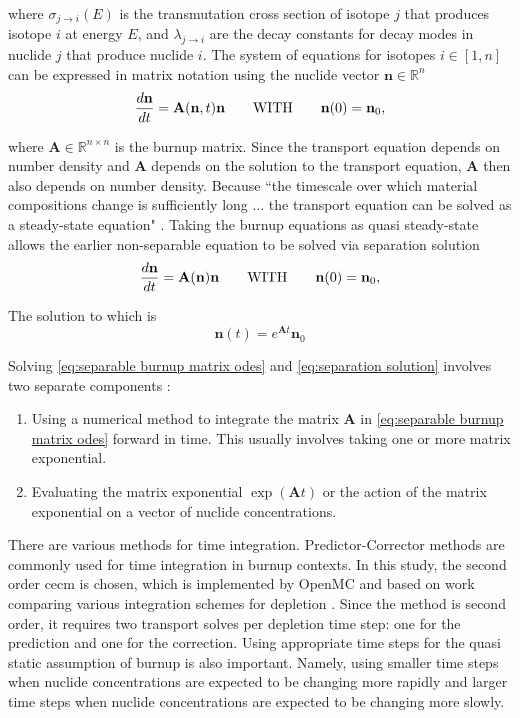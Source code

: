 \documentclass[letterpaper]{physor2024}
\begin{document}
\noindent where $\sigma_{j\rightarrow{i}}(E)$ is the transmutation cross section of isotope $j$ that produces isotope $i$ at energy $E$, and $\lambda_{j\rightarrow{i}}$ are the decay constants for decay modes in nuclide $j$ that produce nuclide $i$. The system of equations for isotopes $i\in[1,n]$ can be expressed in matrix notation using the nuclide vector $\mathbf{n}\in\mathbb{R}^{n}$
\begin{equation} \label{eq:burnup matrix odes}
    \frac{d\textbf{n}}{dt} =
    \textbf{A}(\textbf{n},t) \textbf{n}
    \qquad \text{WITH} \qquad
    \textbf{n}(0) = \textbf{n}_{0},
\end{equation}

\noindent where $\textbf{A}\in\mathbb{R}^{n\times n}$ is the burnup matrix. Since the transport equation depends on number density and $\textbf{A}$ depends on the solution to the transport equation, $\textbf{A}$ then also depends on number density. Because ``the timescale over which material compositions change is sufficiently long ... the transport equation can be solved as a steady-state equation" \cite{romano-depletion-2021}. Taking the burnup equations as quasi steady-state allows the earlier non-separable equation to be solved via separation solution
\begin{equation} \label{eq:separable burnup matrix odes}
    \frac{d\textbf{n}}{dt} =
    \textbf{A}(\textbf{n}) \textbf{n}
    \qquad \text{WITH} \qquad
    \textbf{n}(0) = \textbf{n}_{0},
\end{equation}

\noindent The solution to which is
\begin{equation} \label{eq:separation solution}
     \textbf{n}(t) = e^{\textbf{A}t} \textbf{n}_{0}
\end{equation}

\noindent Solving \cref{eq:separable burnup matrix odes} and \cref{eq:separation solution} involves two separate components \cite{romano-depletion-2021}:
\begin{enumerate}
    \item Using a numerical method to integrate the matrix $\textbf{A}$ in \cref{eq:separable burnup matrix odes} forward in time. This usually involves taking one or more matrix exponential.
    \item Evaluating the matrix exponential $\exp(\textbf{A}t)$ or the action of the matrix exponential on a vector of nuclide concentrations.
\end{enumerate}

There are various methods for time integration. Predictor-Corrector methods are commonly used for time integration in burnup contexts. In this study, the second order \gls{cecm} is chosen, which is implemented by OpenMC and based on work comparing various integration schemes for depletion \cite{isotalo_comparison_2015}. Since the method is second order, it requires two transport solves per depletion time step: one for the prediction and one for the correction. Using appropriate time steps for the quasi static assumption of burnup is also important. Namely, using smaller time steps when nuclide concentrations are expected to be changing more rapidly and larger time steps when nuclide concentrations are expected to be changing more slowly.
\end{document}
